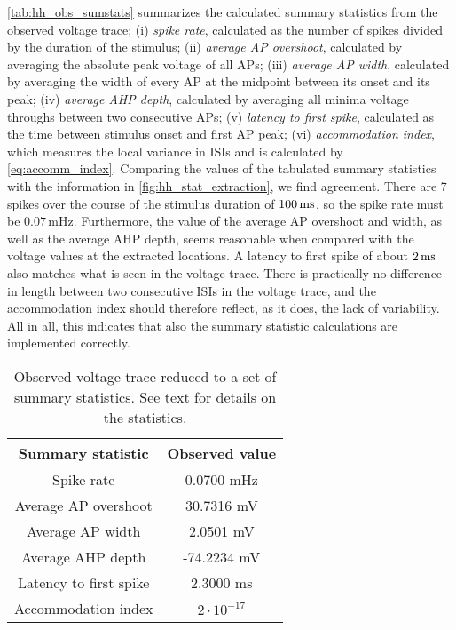 \autoref{tab:hh_obs_sumstats} summarizes the calculated summary statistics from the observed voltage trace; (i) \textit{spike rate}, calculated as the number of spikes divided by the duration of the stimulus; (ii) \textit{average AP overshoot}, calculated by averaging the absolute peak voltage of all APs; (iii) \textit{average AP width}, calculated by averaging the width of every AP at the midpoint between its onset and its peak; (iv) \textit{average AHP depth}, calculated by averaging all minima voltage throughs between two consecutive APs; (v) \textit{latency to first spike}, calculated as the time between stimulus onset and first AP peak; (vi) \textit{accommodation index}, which measures the local variance in ISIs and is calculated by \cref{eq:accomm_index}. Comparing the values of the tabulated summary statistics with the information in \autoref{fig:hh_stat_extraction}, we find agreement. There are 7 spikes over the course of the stimulus duration of $100 \,\mathrm{ms}$, so the spike rate must be $0.07 \, \mathrm{mHz}$. Furthermore, the value of the average AP overshoot and width, as well as the average AHP depth, seems reasonable when compared with the voltage values at the extracted locations. A latency to first spike of about $2 \,\mathrm{ms}$ also matches what is seen in the voltage trace. There is practically no difference in length between two consecutive ISIs in the voltage trace, and the accommodation index should therefore reflect, as it does, the lack of variability. All in all, this indicates that also the summary statistic calculations are implemented correctly. 

\begin{table}[!htb]
  \caption{Observed voltage trace reduced to a set of summary statistics. See text for details on the statistics.  }
  \begin{center}
    \begin{tabular}{cc}
      \toprule
      \textbf{Summary statistic} & \textbf{Observed value} \\
      \midrule
      Spike rate &  0.0700 mHz \\
      Average AP overshoot & 30.7316 mV  \\
      Average AP width &  2.0501 mV \\
      Average AHP depth & -74.2234 mV \\
      Latency to first spike & 2.3000 ms \\
      Accommodation index &  $2 \cdot 10^{-17}$ \\
      \bottomrule
    \end{tabular}
  \end{center}
  \label{tab:hh_obs_sumstats}
\end{table}


